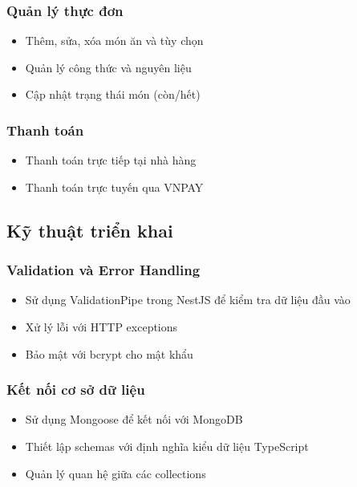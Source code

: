 \documentclass[a4paper]{article}
\begin{document}
\begin{itemize}
        \subsubsection{Quản lý thực đơn}
        \begin{itemize}
            \item Thêm, sửa, xóa món ăn và tùy chọn
            \item Quản lý công thức và nguyên liệu
            \item Cập nhật trạng thái món (còn/hết)
        \end{itemize}
        
        \subsubsection{Thanh toán}
        \begin{itemize}
            \item Thanh toán trực tiếp tại nhà hàng
            \item Thanh toán trực tuyến qua VNPAY
        \end{itemize}

    \subsection{Kỹ thuật triển khai}
        \subsubsection{Validation và Error Handling}
        \begin{itemize}
            \item Sử dụng ValidationPipe trong NestJS để kiểm tra dữ liệu đầu vào
            \item Xử lý lỗi với HTTP exceptions
            \item Bảo mật với bcrypt cho mật khẩu
        \end{itemize}
        
        \subsubsection{Kết nối cơ sở dữ liệu}
        \begin{itemize}
            \item Sử dụng Mongoose để kết nối với MongoDB
            \item Thiết lập schemas với định nghĩa kiểu dữ liệu TypeScript
            \item Quản lý quan hệ giữa các collections
        \end{itemize}
   


\end{itemize}
\end{document}
